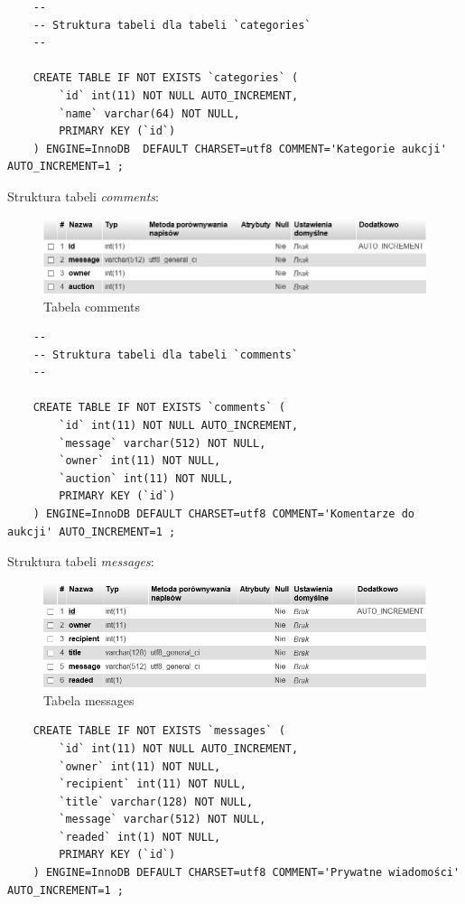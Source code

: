 \documentclass[a4paper]{article}
\begin{document}
	\begin{verbatim}
	--
	-- Struktura tabeli dla tabeli `categories`
	--
	
	CREATE TABLE IF NOT EXISTS `categories` (
		`id` int(11) NOT NULL AUTO_INCREMENT,
		`name` varchar(64) NOT NULL,
		PRIMARY KEY (`id`)
	) ENGINE=InnoDB  DEFAULT CHARSET=utf8 COMMENT='Kategorie aukcji' AUTO_INCREMENT=1 ;
	\end{verbatim}
	
	Struktura tabeli \emph{comments}:
	
	\begin{figure}[h]
		\centering
		\includegraphics[width=12cm]{images/comments.jpg}
		\caption{Tabela comments}
	\end{figure}
	
	\begin{verbatim}
	--
	-- Struktura tabeli dla tabeli `comments`
	--
	
	CREATE TABLE IF NOT EXISTS `comments` (
		`id` int(11) NOT NULL AUTO_INCREMENT,
		`message` varchar(512) NOT NULL,
		`owner` int(11) NOT NULL,
		`auction` int(11) NOT NULL,
		PRIMARY KEY (`id`)
	) ENGINE=InnoDB DEFAULT CHARSET=utf8 COMMENT='Komentarze do aukcji' AUTO_INCREMENT=1 ;
	\end{verbatim}
	
	Struktura tabeli \emph{messages}:
	
	\begin{figure}[h]
		\centering
		\includegraphics[width=12cm]{images/messages.jpg}
		\caption{Tabela messages}
	\end{figure}
	
	\begin{verbatim}
	CREATE TABLE IF NOT EXISTS `messages` (
		`id` int(11) NOT NULL AUTO_INCREMENT,
		`owner` int(11) NOT NULL,
		`recipient` int(11) NOT NULL,
		`title` varchar(128) NOT NULL,
		`message` varchar(512) NOT NULL,
		`readed` int(1) NOT NULL,
		PRIMARY KEY (`id`)
	) ENGINE=InnoDB DEFAULT CHARSET=utf8 COMMENT='Prywatne wiadomości' AUTO_INCREMENT=1 ;
	\end{verbatim}
	
\end{document}
